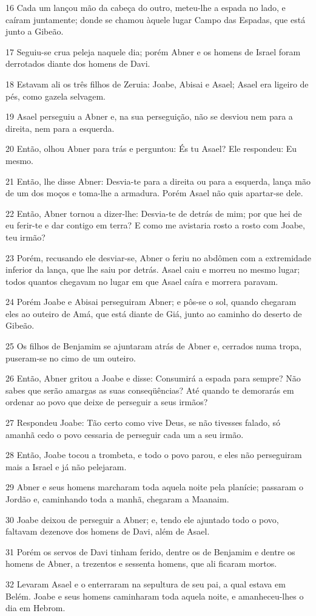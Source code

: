 \par 16 Cada um lançou mão da cabeça do outro, meteu-lhe a espada no lado, e caíram juntamente; donde se chamou àquele lugar Campo das Espadas, que está junto a Gibeão.
\par 17 Seguiu-se crua peleja naquele dia; porém Abner e os homens de Israel foram derrotados diante dos homens de Davi.
\par 18 Estavam ali os três filhos de Zeruia: Joabe, Abisai e Asael; Asael era ligeiro de pés, como gazela selvagem.
\par 19 Asael perseguiu a Abner e, na sua perseguição, não se desviou nem para a direita, nem para a esquerda.
\par 20 Então, olhou Abner para trás e perguntou: És tu Asael? Ele respondeu: Eu mesmo.
\par 21 Então, lhe disse Abner: Desvia-te para a direita ou para a esquerda, lança mão de um dos moços e toma-lhe a armadura. Porém Asael não quis apartar-se dele.
\par 22 Então, Abner tornou a dizer-lhe: Desvia-te de detrás de mim; por que hei de eu ferir-te e dar contigo em terra? E como me avistaria rosto a rosto com Joabe, teu irmão?
\par 23 Porém, recusando ele desviar-se, Abner o feriu no abdômen com a extremidade inferior da lança, que lhe saiu por detrás. Asael caiu e morreu no mesmo lugar; todos quantos chegavam no lugar em que Asael caíra e morrera paravam.
\par 24 Porém Joabe e Abisai perseguiram Abner; e pôs-se o sol, quando chegaram eles ao outeiro de Amá, que está diante de Giá, junto ao caminho do deserto de Gibeão.
\par 25 Os filhos de Benjamim se ajuntaram atrás de Abner e, cerrados numa tropa, puseram-se no cimo de um outeiro.
\par 26 Então, Abner gritou a Joabe e disse: Consumirá a espada para sempre? Não sabes que serão amargas as suas conseqüências? Até quando te demorarás em ordenar ao povo que deixe de perseguir a seus irmãos?
\par 27 Respondeu Joabe: Tão certo como vive Deus, se não tivesses falado, só amanhã cedo o povo cessaria de perseguir cada um a seu irmão.
\par 28 Então, Joabe tocou a trombeta, e todo o povo parou, e eles não perseguiram mais a Israel e já não pelejaram.
\par 29 Abner e seus homens marcharam toda aquela noite pela planície; passaram o Jordão e, caminhando toda a manhã, chegaram a Maanaim.
\par 30 Joabe deixou de perseguir a Abner; e, tendo ele ajuntado todo o povo, faltavam dezenove dos homens de Davi, além de Asael.
\par 31 Porém os servos de Davi tinham ferido, dentre os de Benjamim e dentre os homens de Abner, a trezentos e sessenta homens, que ali ficaram mortos.
\par 32 Levaram Asael e o enterraram na sepultura de seu pai, a qual estava em Belém. Joabe e seus homens caminharam toda aquela noite, e amanheceu-lhes o dia em Hebrom.


